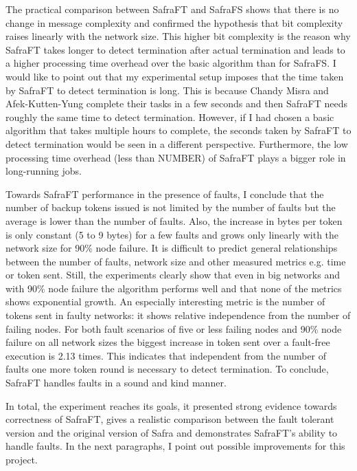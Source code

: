 The practical comparison between SafraFT and SafraFS shows that there is no change in message complexity and confirmed the hypothesis that bit complexity raises linearly with the network size.
This higher bit complexity is the reason why SafraFT takes longer to detect termination after actual termination and leads to a higher processing time overhead over the basic algorithm than for SafraFS.
I would like to point out that my experimental setup imposes that the time taken by SafraFT to detect termination is long.
This is because Chandy Misra and Afek-Kutten-Yung complete their tasks in a few seconds and then SafraFT needs roughly the same time to detect termination.
However, if I had chosen a basic algorithm that takes multiple hours to complete, the seconds taken by SafraFT to detect termination would be seen in a different perspective.
Furthermore, the low processing time overhead (less than NUMBER)  %
of SafraFT plays a bigger role in long-running jobs.

Towards SafraFT performance in the presence of faults, I conclude that the number of backup tokens issued is not limited by the number of faults but the average is lower than the number of faults.
Also, the increase in bytes per token is only constant (5 to 9 bytes) for a few faults and grows only linearly with the network size for 90\% node failure.  %
It is difficult to predict general relationships between the number of faults, network size and other measured metrics e.g. time or token sent.
Still, the experiments clearly show that even in big networks and with 90\% node failure the algorithm performs well and that none of the metrics shows exponential growth.
An especially interesting metric is the number of tokens sent in faulty networks: it shows relative independence from the number of failing nodes.
For both fault scenarios of five or less failing nodes and 90\% node failure on all network sizes the biggest increase in token sent over a fault-free execution is 2.13 times. %
This indicates that independent from the number of faults one more token round is necessary to detect termination.
To conclude, SafraFT handles faults in a sound and kind manner.

In total, the experiment reaches its goals, it presented strong evidence towards correctness of SafraFT, gives a realistic comparison between the fault tolerant version and the original version of Safra and demonstrates SafraFT's ability to handle faults.
In the next paragraphs, I point out possible improvements for this project.

